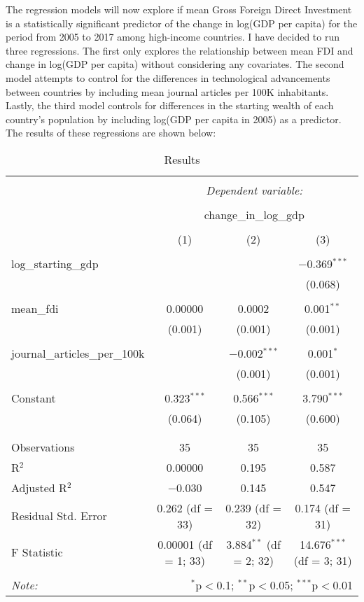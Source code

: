\documentclass{article}
\begin{document}
The regression models will now explore if mean Gross Foreign Direct Investment is a statistically significant predictor of the change in log(GDP per capita) for the period from 2005 to 2017 among high-income countries. I have decided to run three regressions. The first only explores the relationship between mean FDI and change in log(GDP per capita) without considering any covariates. The second model attempts to control for the differences in technological advancements between countries by including mean journal articles per 100K inhabitants. Lastly, the third model controls for differences in the starting wealth of each country's population by including log(GDP per capita in 2005) as a predictor. The results of these regressions are shown below:
\begin{table}[!htbp] \centering 
  \caption{Results} 
  \label{} 
\begin{tabular}{@{\extracolsep{5pt}}lccc} 
\\[-1.8ex]\hline 
\hline \\[-1.8ex] 
 & \multicolumn{3}{c}{\textit{Dependent variable:}} \\ 
\cline{2-4} 
\\[-1.8ex] & \multicolumn{3}{c}{change\_in\_log\_gdp} \\ 
\\[-1.8ex] & (1) & (2) & (3)\\ 
\hline \\[-1.8ex] 
 log\_starting\_gdp &  &  & $-$0.369$^{***}$ \\ 
  &  &  & (0.068) \\ 
  & & & \\ 
 mean\_fdi & 0.00000 & 0.0002 & 0.001$^{**}$ \\ 
  & (0.001) & (0.001) & (0.001) \\ 
  & & & \\ 
 journal\_articles\_per\_100k &  & $-$0.002$^{***}$ & 0.001$^{*}$ \\ 
  &  & (0.001) & (0.001) \\ 
  & & & \\ 
 Constant & 0.323$^{***}$ & 0.566$^{***}$ & 3.790$^{***}$ \\ 
  & (0.064) & (0.105) & (0.600) \\ 
  & & & \\ 
\hline \\[-1.8ex] 
Observations & 35 & 35 & 35 \\ 
R$^{2}$ & 0.00000 & 0.195 & 0.587 \\ 
Adjusted R$^{2}$ & $-$0.030 & 0.145 & 0.547 \\ 
Residual Std. Error & 0.262 (df = 33) & 0.239 (df = 32) & 0.174 (df = 31) \\ 
F Statistic & 0.00001 (df = 1; 33) & 3.884$^{**}$ (df = 2; 32) & 14.676$^{***}$ (df = 3; 31) \\ 
\hline 
\hline \\[-1.8ex] 
\textit{Note:}  & \multicolumn{3}{r}{$^{*}$p$<$0.1; $^{**}$p$<$0.05; $^{***}$p$<$0.01} \\ 
\end{tabular} 
\end{table} 
\newpage
\end{document}
